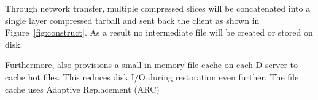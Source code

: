 

Through network transfer, multiple compressed slices will be concatenated into a single
layer compressed tarball and sent back the client as shown in Figure~\ref{fig:construct}.
As a result no intermediate file will be created or stored on disk. %
%

Furthermore, \sysname also provisions a small in-memory file cache on each D-server to cache hot files.
This reduces disk I/O during restoration even further. The file cache uses Adaptive
Replacement (ARC)~\cite{xxx} 
%

 
